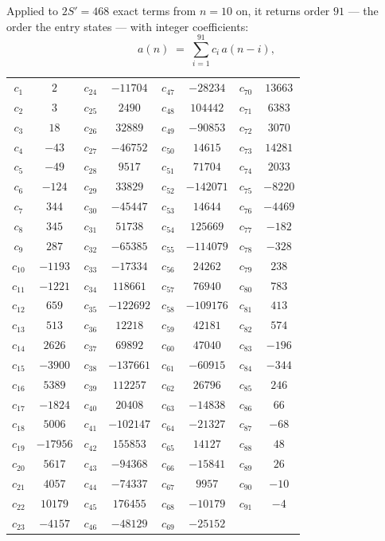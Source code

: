\documentclass[11pt,a4paper]{article}
\theoremstyle{plain}
\theoremstyle{definition}
\begin{document}
Applied to $2S'=468$ exact terms from $n=10$ on, it returns order $91$ --- the
order the entry states --- with integer coefficients:
\[
a(n)\;=\;\sum_{i=1}^{91}c_i\,a(n-i),
\]
\begin{center}\small
\begin{tabular}{cccccccc}
$c_{1}$ & $2$ & $c_{24}$ & $-11704$ & $c_{47}$ & $-28234$ & $c_{70}$ & $13663$ \\
$c_{2}$ & $3$ & $c_{25}$ & $2490$ & $c_{48}$ & $104442$ & $c_{71}$ & $6383$ \\
$c_{3}$ & $18$ & $c_{26}$ & $32889$ & $c_{49}$ & $-90853$ & $c_{72}$ & $3070$ \\
$c_{4}$ & $-43$ & $c_{27}$ & $-46752$ & $c_{50}$ & $14615$ & $c_{73}$ & $14281$ \\
$c_{5}$ & $-49$ & $c_{28}$ & $9517$ & $c_{51}$ & $71704$ & $c_{74}$ & $2033$ \\
$c_{6}$ & $-124$ & $c_{29}$ & $33829$ & $c_{52}$ & $-142071$ & $c_{75}$ & $-8220$ \\
$c_{7}$ & $344$ & $c_{30}$ & $-45447$ & $c_{53}$ & $14644$ & $c_{76}$ & $-4469$ \\
$c_{8}$ & $345$ & $c_{31}$ & $51738$ & $c_{54}$ & $125669$ & $c_{77}$ & $-182$ \\
$c_{9}$ & $287$ & $c_{32}$ & $-65385$ & $c_{55}$ & $-114079$ & $c_{78}$ & $-328$ \\
$c_{10}$ & $-1193$ & $c_{33}$ & $-17334$ & $c_{56}$ & $24262$ & $c_{79}$ & $238$ \\
$c_{11}$ & $-1221$ & $c_{34}$ & $118661$ & $c_{57}$ & $76940$ & $c_{80}$ & $783$ \\
$c_{12}$ & $659$ & $c_{35}$ & $-122692$ & $c_{58}$ & $-109176$ & $c_{81}$ & $413$ \\
$c_{13}$ & $513$ & $c_{36}$ & $12218$ & $c_{59}$ & $42181$ & $c_{82}$ & $574$ \\
$c_{14}$ & $2626$ & $c_{37}$ & $69892$ & $c_{60}$ & $47040$ & $c_{83}$ & $-196$ \\
$c_{15}$ & $-3900$ & $c_{38}$ & $-137661$ & $c_{61}$ & $-60915$ & $c_{84}$ & $-344$ \\
$c_{16}$ & $5389$ & $c_{39}$ & $112257$ & $c_{62}$ & $26796$ & $c_{85}$ & $246$ \\
$c_{17}$ & $-1824$ & $c_{40}$ & $20408$ & $c_{63}$ & $-14838$ & $c_{86}$ & $66$ \\
$c_{18}$ & $5006$ & $c_{41}$ & $-102147$ & $c_{64}$ & $-21327$ & $c_{87}$ & $-68$ \\
$c_{19}$ & $-17956$ & $c_{42}$ & $155853$ & $c_{65}$ & $14127$ & $c_{88}$ & $48$ \\
$c_{20}$ & $5617$ & $c_{43}$ & $-94368$ & $c_{66}$ & $-15841$ & $c_{89}$ & $26$ \\
$c_{21}$ & $4057$ & $c_{44}$ & $-74337$ & $c_{67}$ & $9957$ & $c_{90}$ & $-10$ \\
$c_{22}$ & $10179$ & $c_{45}$ & $176455$ & $c_{68}$ & $-10179$ & $c_{91}$ & $-4$ \\
$c_{23}$ & $-4157$ & $c_{46}$ & $-48129$ & $c_{69}$ & $-25152$ &  &  \\
\end{tabular}
\end{center}
\end{document}
